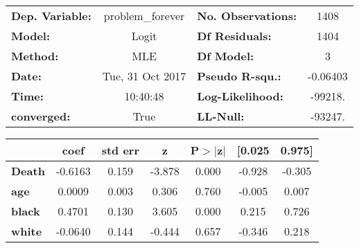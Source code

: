 \documentclass{report}
\begin{document}
\begin{center}
\begin{tabular}{lclc}
\toprule
\textbf{Dep. Variable:} & problem_forever  & \textbf{  No. Observations:  } &     1408    \\
\textbf{Model:}         &      Logit       & \textbf{  Df Residuals:      } &     1404    \\
\textbf{Method:}        &       MLE        & \textbf{  Df Model:          } &        3    \\
\textbf{Date:}          & Tue, 31 Oct 2017 & \textbf{  Pseudo R-squ.:     } &  -0.06403   \\
\textbf{Time:}          &     10:40:48     & \textbf{  Log-Likelihood:    } &   -99218.   \\
\textbf{converged:}     &       True       & \textbf{  LL-Null:           } &   -93247.   \\
\bottomrule
\end{tabular}
\begin{tabular}{lcccccc}
               & \textbf{coef} & \textbf{std err} & \textbf{z} & \textbf{P$>$$|$z$|$} & \textbf{[0.025} & \textbf{0.975]}  \\
\midrule
\textbf{Death} &      -0.6163  &        0.159     &    -3.878  &         0.000        &       -0.928    &       -0.305     \\
\textbf{age}   &       0.0009  &        0.003     &     0.306  &         0.760        &       -0.005    &        0.007     \\
\textbf{black} &       0.4701  &        0.130     &     3.605  &         0.000        &        0.215    &        0.726     \\
\textbf{white} &      -0.0640  &        0.144     &    -0.444  &         0.657        &       -0.346    &        0.218     \\
\bottomrule
\end{tabular}
\end{center}
\end{document}
